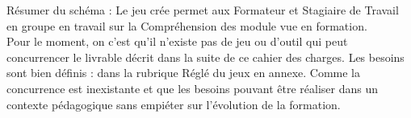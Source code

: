 
Résumer du schéma : Le jeu crée permet aux Formateur et Stagiaire de Travail en groupe en travail sur la Compréhension des module vue en formation.\\

Pour le moment, on c'est qu'il n'existe pas de jeu ou d'outil qui peut concurrencer le livrable décrit dans la suite de ce cahier des charges. Les besoins sont bien définis : dans la rubrique Réglé du jeux en annexe. Comme la concurrence est inexistante et que les besoins pouvant être réaliser dans un contexte pédagogique sans empiéter sur l'évolution de la formation. 
